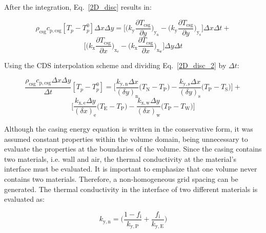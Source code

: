 \documentclass[review,preprint,12pt]{elsarticle}
\begin{document}
After the integration, Eq.~\eqref{2D_disc} results in:

\begin{equation}
\rho_\textrm{csg} c_\mathrm{p,csg}[T_p-T^0_p]\Delta x \Delta y = \Bigg[\Bigg(k_\mathrm{y}\frac{\partial T_\textrm{csg}}{\partial y}\Bigg)_\mathrm{y_n}-\Bigg(k_\mathrm{y}\frac{\partial T_\textrm{csg}}{\partial y}\Bigg)_\mathrm{y_s}\Bigg] \Delta x \Delta t + \nonumber 
\end{equation}
\begin{equation}
\Bigg[\Bigg(k_\mathrm{x}\frac{\partial T_\textrm{csg}}{\partial x}\Bigg)_\mathrm{x_e}-\Bigg(k_\mathrm{x}\frac{\partial T_\textrm{csg}}{\partial x}\Bigg)_\mathrm{x_w}\Bigg] \Delta y \Delta t
\label{2D_disc_2}
\end{equation}

Using the CDS interpolation scheme and dividing Eq.~\eqref{2D_disc_2} by $\Delta t$:

\begin{equation}
\frac{\rho_\textrm{csg} c_\mathrm{p,csg}\Delta x \Delta y}{\Delta t}[T_p-T^0_p] = \Bigg[\frac{k_\mathrm{y,n}\Delta x}{(\delta y)_\mathrm{n}}\big(T_\mathrm{N}-T_\mathrm{P}\big) -\frac{k_\mathrm{y,s}\Delta x}{(\delta y)_\mathrm{s}}\big(T_\mathrm{P}-T_\mathrm{S}\big)\Bigg] +
\nonumber 
\end{equation}
\begin{equation}
\Bigg[\frac{k_\mathrm{x,e}\Delta y}{(\delta x)_\mathrm{e}}\big(T_\mathrm{E}-T_\mathrm{P}\big) -\frac{k_\mathrm{x,w}\Delta y}{(\delta x)_\mathrm{w}}\big(T_\mathrm{P}-T_\mathrm{W}\big)\Bigg]
\label{2D_disc_3}
\end{equation}

Although the casing energy equation is written in the conservative form, it was assumed constant properties within the volume domain, being unnecessary to evaluate the properties at the boundaries of the volume. Since the casing contains two materials, i.e. wall and air, the thermal conductivity at the material's interface must be evaluated. It is important to emphasize that one volume never contains two materials. Therefore, a non-homogeneous grid spacing can be generated. The thermal conductivity in the interface of two different materials is evaluated as:

\begin{equation}
k_\mathrm{y,n} = \Bigg(\frac{1-f_\textrm{i}}{k_\mathrm{y,P}} + \frac{f_\textrm{i}}{k_\mathrm{y,E}}\Bigg)
\label{k_evaluation}
\end{equation}
\end{document}
